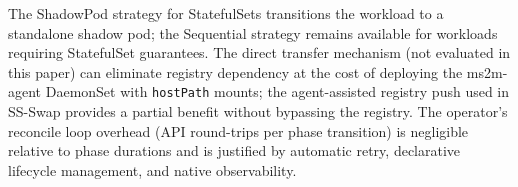 \documentclass[conference]{IEEEtran}
\begin{document}
The ShadowPod strategy for StatefulSets transitions the workload to a standalone
shadow pod; the Sequential strategy remains available for workloads requiring
StatefulSet guarantees. The direct transfer mechanism (not evaluated in this paper) can
eliminate registry dependency at the cost of deploying the ms2m-agent DaemonSet
with \texttt{hostPath} mounts; the agent-assisted registry push used in
SS-Swap provides a partial benefit without bypassing the registry. The operator's reconcile loop overhead (API
round-trips per phase transition) is negligible relative to phase durations and
is justified by automatic retry, declarative lifecycle management, and native
observability.
%
%
\end{document}
